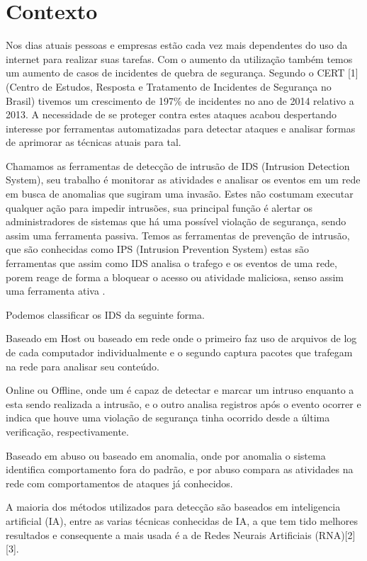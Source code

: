 \documentclass[
	12pt,				%
	openright,			%
	oneside,
	a4paper,			%
	english,			%
	french,				%
	spanish,			%
	brazil				%
	]{abntex2}
\begin{document}
\section{Contexto}

Nos dias atuais pessoas e empresas estão cada vez mais dependentes do uso da internet para realizar suas tarefas. Com o aumento da utilização também temos um aumento de casos de incidentes de quebra de segurança. Segundo o CERT [1](Centro de Estudos, Resposta e Tratamento de Incidentes de Segurança no Brasil) tivemos um crescimento de 197\% de incidentes no ano de 2014 relativo a 2013. A necessidade de se proteger contra estes
ataques acabou despertando interesse por ferramentas automatizadas para detectar ataques e analisar formas de aprimorar as técnicas atuais para tal.

Chamamos as ferramentas de detecção de intrusão de IDS (Intrusion Detection System), seu trabalho é monitorar as atividades e analisar os eventos em um rede em busca de anomalias que sugiram uma invasão. Estes não costumam executar qualquer ação para impedir intrusões, sua principal função é alertar os administradores de sistemas que há uma possível violação de segurança, sendo assim uma ferramenta passiva.
Temos as ferramentas de prevenção de intrusão, que são conhecidas como IPS (Intrusion Prevention System) estas são ferramentas que assim como IDS analisa o trafego e os eventos de uma rede, porem reage de forma a bloquear o acesso ou atividade maliciosa, senso assim uma ferramenta ativa .

Podemos classificar os IDS da seguinte forma. 

Baseado em Host ou baseado em rede onde o primeiro faz uso de arquivos de log de cada computador individualmente e o segundo captura pacotes que trafegam na rede para analisar seu conteúdo.

Online ou Offline, onde um é capaz de detectar e marcar um intruso enquanto a esta sendo realizada a intrusão, e o outro analisa registros após o evento ocorrer e indica que houve uma violação de segurança tinha ocorrido desde a última verificação, respectivamente.

Baseado em abuso ou baseado em anomalia, onde por anomalia o sistema identifica comportamento fora do padrão, e por abuso compara as atividades na rede com comportamentos de ataques já conhecidos.

A maioria dos métodos utilizados para detecção são baseados em inteligencia artificial (IA), entre as varias técnicas conhecidas de IA, a que tem tido melhores resultados e consequente a mais usada é a de Redes Neurais Artificiais (RNA)[2][3].
\end{document}
